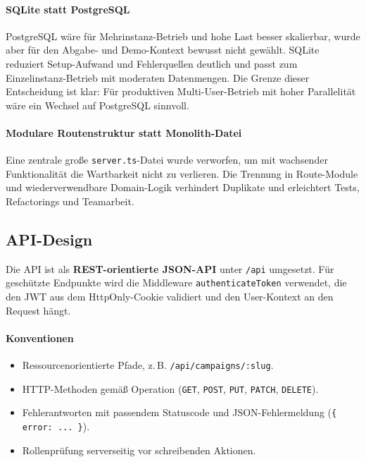 \paragraph{SQLite statt PostgreSQL}
PostgreSQL wäre für Mehrinstanz-Betrieb und hohe Last besser skalierbar, wurde
aber für den Abgabe- und Demo-Kontext bewusst nicht gewählt.
SQLite reduziert Setup-Aufwand und Fehlerquellen deutlich und passt zum
Einzelinstanz-Betrieb mit moderaten Datenmengen.
Die Grenze dieser Entscheidung ist klar: Für produktiven Multi-User-Betrieb mit
hoher Parallelität wäre ein Wechsel auf PostgreSQL sinnvoll.

\paragraph{Modulare Routenstruktur statt Monolith-Datei}
Eine zentrale große \texttt{server.ts}-Datei wurde verworfen, um mit wachsender
Funktionalität die Wartbarkeit nicht zu verlieren.
Die Trennung in Route-Module und wiederverwendbare Domain-Logik verhindert
Duplikate und erleichtert Tests, Refactorings und Teamarbeit.

\subsection{API-Design}

Die API ist als \textbf{REST-orientierte JSON-API} unter \texttt{/api} umgesetzt.
Für geschützte Endpunkte wird die Middleware \texttt{authenticateToken}
verwendet, die den JWT aus dem HttpOnly-Cookie validiert und den User-Kontext
an den Request hängt.

\paragraph{Konventionen}
\begin{itemize}
  \item Ressourcenorientierte Pfade, z.\,B. \texttt{/api/campaigns/:slug}.
  \item HTTP-Methoden gemäß Operation (\texttt{GET}, \texttt{POST},
  \texttt{PUT}, \texttt{PATCH}, \texttt{DELETE}).
  \item Fehlerantworten mit passendem Statuscode und JSON-Fehlermeldung
  (\texttt{\{ error: ... \}}).
  \item Rollenprüfung serverseitig vor schreibenden Aktionen.
\end{itemize}

